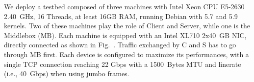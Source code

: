 
We deploy a testbed composed of three machines with Intel Xeon CPU E5-2630
2.40~GHz, 16 Threads, at least 16GB RAM, running Debian with 5.7 and
5.9 kernels. Two of these machines play the role of Client and Server,
while one is the Middlebox (MB). Each machine is equipped with an
Intel XL710 2x40~GB NIC, directly connected as shown in Fig.~.
Traffic exchanged by C and S has to go through MB first. Each device is
configured to maximize its performances, with a single TCP connection
reaching 22 Gbps with a 1500~Bytes MTU and linerate (i.e., 40~Gbps) when
using jumbo frames.

